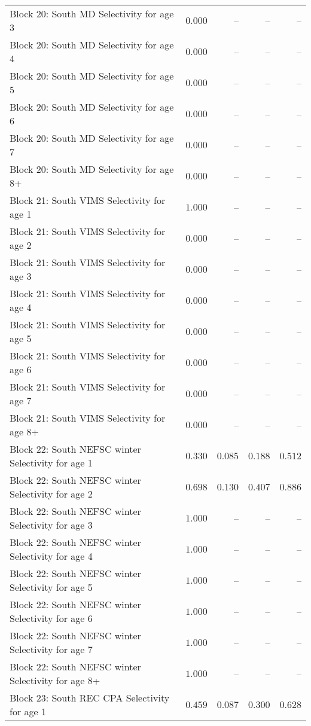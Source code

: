 \documentclass[
]{article}
\begin{document}
\begin{landscape}
\begin{longtable}[t]{lrrrr}
Block 20: South MD Selectivity for age 3 & $0.000$ & -- & -- & --\\
Block 20: South MD Selectivity for age 4 & $0.000$ & -- & -- & --\\
Block 20: South MD Selectivity for age 5 & $0.000$ & -- & -- & --\\
Block 20: South MD Selectivity for age 6 & $0.000$ & -- & -- & --\\
\addlinespace
Block 20: South MD Selectivity for age 7 & $0.000$ & -- & -- & --\\
Block 20: South MD Selectivity for age 8+ & $0.000$ & -- & -- & --\\
Block 21: South VIMS Selectivity for age 1 & $1.000$ & -- & -- & --\\
Block 21: South VIMS Selectivity for age 2 & $0.000$ & -- & -- & --\\
Block 21: South VIMS Selectivity for age 3 & $0.000$ & -- & -- & --\\
\addlinespace
Block 21: South VIMS Selectivity for age 4 & $0.000$ & -- & -- & --\\
Block 21: South VIMS Selectivity for age 5 & $0.000$ & -- & -- & --\\
Block 21: South VIMS Selectivity for age 6 & $0.000$ & -- & -- & --\\
Block 21: South VIMS Selectivity for age 7 & $0.000$ & -- & -- & --\\
Block 21: South VIMS Selectivity for age 8+ & $0.000$ & -- & -- & --\\
\addlinespace
Block 22: South NEFSC winter Selectivity for age 1 & $0.330$ & $0.085$ & $0.188$ & $0.512$\\
Block 22: South NEFSC winter Selectivity for age 2 & $0.698$ & $0.130$ & $0.407$ & $0.886$\\
Block 22: South NEFSC winter Selectivity for age 3 & $1.000$ & -- & -- & --\\
Block 22: South NEFSC winter Selectivity for age 4 & $1.000$ & -- & -- & --\\
Block 22: South NEFSC winter Selectivity for age 5 & $1.000$ & -- & -- & --\\
\addlinespace
Block 22: South NEFSC winter Selectivity for age 6 & $1.000$ & -- & -- & --\\
Block 22: South NEFSC winter Selectivity for age 7 & $1.000$ & -- & -- & --\\
Block 22: South NEFSC winter Selectivity for age 8+ & $1.000$ & -- & -- & --\\
Block 23: South REC CPA Selectivity for age 1 & $0.459$ & $0.087$ & $0.300$ & $0.628$\\

\end{longtable}
\end{landscape}
\end{document}
